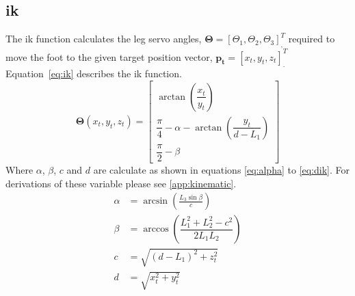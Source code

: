     \subsection{\acf{ik}}
        The \ac{ik} function calculates the leg servo angles, \(\boldsymbol{\Theta} = [\Theta_1, \Theta_2, \Theta_3]^T_{\displaystyle ,}\) required
        to move the foot to the given target position vector, \(\boldsymbol{p_t} = [x_t,y_t,z_t]^T_{\displaystyle .}\)
        \hbox{Equation \ref{eq:ik}} describes the \ac{ik} function.
        \begin{equation}\label{eq:ik}
            \boldsymbol{\Theta}(x_t,y_t,z_t) =
                                \begin{bmatrix}
                                    \arctan{\left(\dfrac{x_t}{y_t}\right)}\\[0.5cm]
                                    \dfrac{\pi}{4} - \alpha - \arctan{\left(\dfrac{y_t}{d-L_1}\right)}\\[0.5cm]
                                    \dfrac{\pi}{2} - \beta
                                \end{bmatrix}
        \end{equation}
        Where \(\alpha\), \(\beta\), \(c\) and \(d\) are calculate as shown in equations \ref{eq:alpha} to \ref{eq:dik}. For derivations of these variable
        please see \ref{app:kinematic}.
        \begin{align}
            \alpha &= \arcsin{\left(\frac{L_3\sin{\beta}}{c}\right)} \label{eq:alpha} \\[0.5cm]
            \beta &= \arccos{\left(\dfrac{L_1^2 + L_2^2 -c^2}{2L_1L_2}\right)}\\[0.5cm]
            c &= \sqrt{(d-L_1)^2+z_t^2}\\[0.5cm]
            d &= \sqrt{x_t^2 + y_t^2} \label{eq:dik}
        \end{align}
